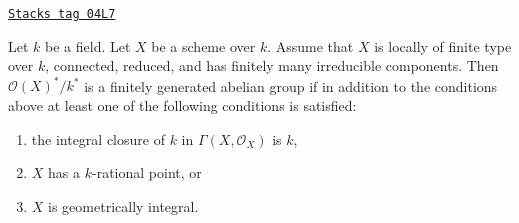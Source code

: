 \begin{proposition}
\label{varieties-proposition-units-general}
\href{https://stacks.math.columbia.edu/tag/04L7}{\texttt{Stacks tag 04L7}}

Let $k$ be a field. Let $X$ be a scheme over $k$. Assume that $X$ is
locally of finite type over $k$, connected, reduced, and has finitely many
irreducible components. Then $\mathcal{O}(X)^*/k^*$ is a finitely generated
abelian group if in addition to the conditions above at least
one of the following conditions is satisfied:
\begin{enumerate}
\item the integral closure of $k$ in $\Gamma(X, \mathcal{O}_X)$ is $k$,
\item $X$ has a $k$-rational point, or
\item $X$ is geometrically integral.
\end{enumerate}
\end{proposition}

